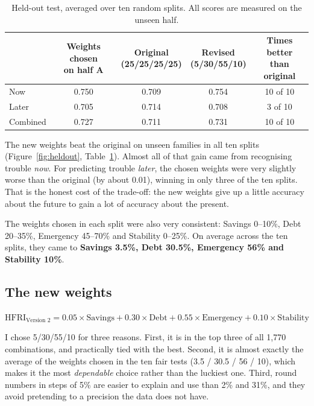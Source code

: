 \documentclass[11pt,a4paper]{article}
\newcommand{\pct}{\%}
\begin{document}
\begin{table}[H]
\centering\small
\caption{Held-out test, averaged over ten random splits. All scores are measured on the unseen half.}
\label{tab:heldout}
\begin{tabular}{lcccc}
\toprule
 & \shortstack{Weights chosen\\on half A} & \shortstack{Original\\(25/25/25/25)} & \shortstack{Revised\\(5/30/55/10)} & \shortstack{Times better\\than original}\\
\midrule
Now & 0.750 & 0.709 & 0.754 & 10 of 10\\
Later & 0.705 & 0.714 & 0.708 & 3 of 10\\
Combined & 0.727 & 0.711 & 0.731 & 10 of 10\\
\bottomrule
\end{tabular}
\end{table}

The new weights beat the original on unseen families in all ten splits (Figure~\ref{fig:heldout},
Table~\ref{tab:heldout}). Almost all of that gain came from recognising trouble \emph{now}. For predicting trouble
\emph{later}, the chosen weights were very slightly worse than the original (by about 0.01), winning in only three of
the ten splits. That is the honest cost of the trade-off: the new weights give up a little accuracy about the future to
gain a lot of accuracy about the present.

The weights chosen in each split were also very consistent: Savings 0--10\pct, Debt 20--35\pct, Emergency 45--70\pct{}
and Stability 0--25\pct. On average across the ten splits, they came to \textbf{Savings 3.5\pct, Debt 30.5\pct,
Emergency 56\pct{} and Stability 10\pct}.

\subsection{The new weights}
\begin{rqbox}
\centering
$\text{HFRI}_{\text{Version 2}} = 0.05\times\text{Savings} + 0.30\times\text{Debt} + 0.55\times\text{Emergency} + 0.10\times\text{Stability}$
\end{rqbox}

I chose 5/30/55/10 for three reasons. First, it is in the top three of all 1,770 combinations, and practically tied with
the best. Second, it is almost exactly the average of the weights chosen in the ten fair tests (3.5 / 30.5 / 56 / 10),
which makes it the most \emph{dependable} choice rather than the luckiest one. Third, round numbers in steps of 5\pct{}
are easier to explain and use than 2\pct{} and 31\pct, and they avoid pretending to a precision the data does not have.
\end{document}

